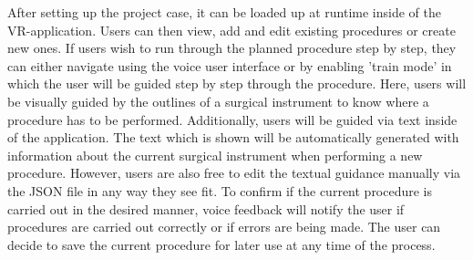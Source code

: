 

After setting up the project case, it can be loaded up at runtime inside of the VR-application.
Users can then view, add and edit existing procedures or create new ones.
If users wish to run through the planned procedure step by step, they can either navigate using the voice user interface or by enabling 'train mode' in which the user will be guided step by step through the procedure.
Here, users will be visually guided by the outlines of a surgical instrument to know where a procedure has to be performed.
Additionally, users will be guided via text inside of the application.
The text which is shown will be automatically generated with information about the current surgical instrument when performing a new procedure.
However, users are also free to edit the textual guidance manually via the JSON file in any way they see fit.
To confirm if the current procedure is carried out in the desired manner, voice feedback will notify the user if procedures are carried out correctly or if errors are being made.
The user can decide to save the current procedure for later use at any time of the process.